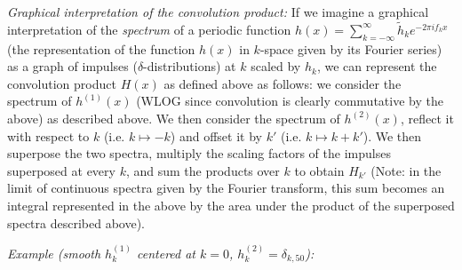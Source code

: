 \documentclass[11pt]{article}
\begin{document}
\begin{enumerate}
	\textit{Graphical interpretation of the convolution product:} If we imagine a graphical interpretation of the \textit{spectrum} of a periodic function $h(x) = \sum_{k=-\infty}^{\infty} \tilde h_k e^{-2 \pi i f_k x}$ (the representation of the function $h(x)$ in $k$-space given by its Fourier series) as a graph of impulses ($\delta$-distributions) at $k$ scaled by $h_k$, we can represent the convolution product $H(x)$ as defined above as follows: we consider the spectrum of $h^{(1)}(x)$ (WLOG since convolution is clearly commutative by the above) as described above. We then consider the spectrum of $h^{(2)}(x)$, reflect it with respect to $k$ (i.e. $k \mapsto -k$) and offset it by $k'$ (i.e. $k \mapsto k + k'$). We then superpose the two spectra, multiply the scaling factors of the impulses superposed at every $k$, and sum the products over $k$ to obtain $H_{k'}$ (Note: in the limit of continuous spectra given by the Fourier transform, this sum becomes an integral represented in the above by the area under the product of the superposed spectra described above).
	
	\textit{Example (smooth $h_k^{(1)}$ centered at $k=0$, $h_k^{(2)} = \delta_{k, 50}$):}


\end{enumerate}
\end{document}
